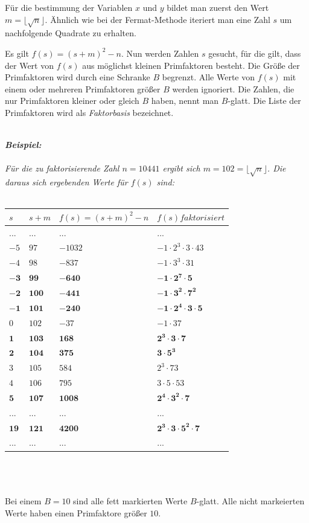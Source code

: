 \documentclass[a4paper,11pt]{article}
\begin{document}
Für die bestimmung der Variablen $x$ und $y$ bildet man zuerst den Wert
$m=\lfloor\sqrt{n}\rfloor$. Ähnlich wie bei der Fermat-Methode iteriert
man eine Zahl $s$ um nachfolgende Quadrate zu erhalten.

Es gilt $f(s) = (s+m)^2 - n$. Nun werden Zahlen $s$ gesucht, für die gilt,
dass der Wert von $f(s)$ aus möglichst kleinen Primfaktoren besteht. Die
Größe der Primfaktoren wird durch eine Schranke $B$ begrenzt.
Alle Werte von $f(s)$ mit einem oder mehreren Primfaktoren größer $B$
werden ignoriert. Die Zahlen, die nur Primfaktoren kleiner oder gleich
$B$ haben, nennt man $B$-glatt. Die Liste der Primfaktoren wird als
\textit{Faktorbasis} bezeichnet.\\\\
{\it
\textbf{Beispiel:}\\\\
Für die zu faktorisierende Zahl $n=10441$ ergibt sich
$m= 102 = \lfloor\sqrt{n}\rfloor$. Die daraus sich ergebenden Werte
für $f(s)$ sind:\\\\

\begin{tabular}{|l|l|l|l|}
\hline
$s$ & $s+m$ & $f(s)=(s+m)^2-n$ & $f(s) faktorisiert$\\
\hline
... & ... & ... & ... \\
\hline
 $-5$ & $97$ & $-1032$ & $-1\cdot2^3\cdot3\cdot43$\\
 \hline
 $-4$ & $98$ & $-837$ &  $-1\cdot3^3\cdot31$\\
 \hline
 $\mathbf{-3}$ & $\mathbf{99}$ &  $\mathbf{-640}$ & $\mathbf{-1\cdot2^7\cdot5}$\\
 \hline
 $\mathbf{-2}$ & $\mathbf{100}$ & $\mathbf{-441}$ & $\mathbf{-1\cdot3^2\cdot7^2}$\\
 \hline
 $\mathbf{-1}$ & $\mathbf{101}$ & $\mathbf{-240}$ & $\mathbf{-1\cdot2^4\cdot3\cdot5}$\\
 \hline
$0$ & $102$ & $-37$ & $-1\cdot37$\\
 \hline
 $\mathbf{1}$ & $\mathbf{103}$ & $\mathbf{168}$ & $\mathbf{2^3\cdot3\cdot7}$\\
 \hline
 $\mathbf{2}$ & $\mathbf{104}$ & $\mathbf{375}$ & $\mathbf{3\cdot5^3}$\\
 \hline
 $3$ & $105$ & $584$ & $2^3\cdot73$\\
 \hline
 $4$ & $106$ & $795$ & $3\cdot5\cdot53$\\
 \hline
 $\mathbf{5}$ & $\mathbf{107}$ & $\mathbf{1008}$ & $\mathbf{2^4\cdot3^2\cdot7}$\\
 \hline
 ... & ... & ... & ...\\
\hline
$\mathbf{19}$ & $\mathbf{121}$ & $\mathbf{4200}$ & $\mathbf{2^3\cdot3\cdot5^2\cdot7}$\\
 \hline
 ... & ... & ... & ...\\
 \hline
\end{tabular}\\\\\\
Bei einem $B=10$ sind alle fett markierten Werte $B$-glatt. Alle nicht
markeierten Werte haben einen Primfaktore größer $10$.
}\\\\
\end{document}

